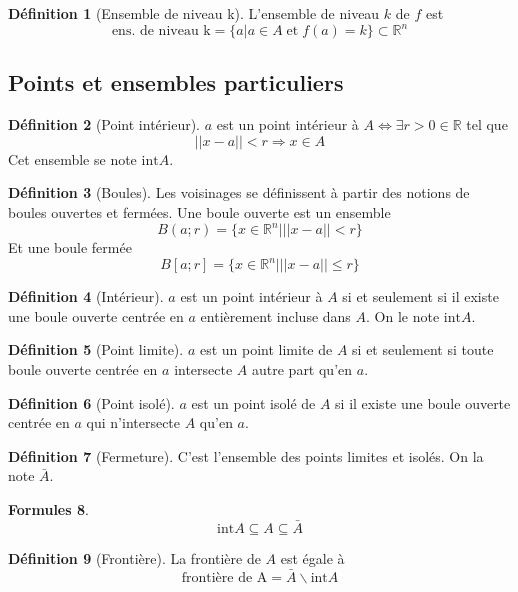 \documentclass[11pt,a4paper]{article}
\theoremstyle{definition}
\newtheorem{mydef}{Définition}[section]
\newtheorem{myform}[mydef]{Formules}
\newcommand{\R}{\mathbb{R}}
\begin{document}
\begin{mydef} [Ensemble de niveau k] L'ensemble de niveau $k$ de $f$ est
\[ \text{ens. de niveau k} = \{ a | a \in A \;\text{et}\; f(a) = k \} \subset \R^n \]
\end{mydef}

\subsection{Points et ensembles particuliers}

\begin{mydef}[Point intérieur] $a$ est un point intérieur à $A \Leftrightarrow \exists r > 0 \in \R$ tel que
\[ ||x - a|| < r \Rightarrow x \in A \]
Cet ensemble se note $\mathrm{int} A$.
\end{mydef}

\begin{mydef} [Boules] Les voisinages se définissent à partir des notions de boules ouvertes et fermées. Une boule ouverte est un ensemble
\[ B(a;r) = \{ x \in \R^n | ||x-a|| < r \} \]
Et une boule fermée
\[ B[a;r] = \{ x \in \R^n | ||x-a|| \leq r \} \]
\end{mydef}

\begin{mydef} [Intérieur] $a$ est un point intérieur à $A$ si et seulement si il existe une boule ouverte centrée en $a$ entièrement incluse dans $A$. On le note $\mathrm{int} A$. \end{mydef}

\begin{mydef} [Point limite] $a$ est un point limite de $A$ si et seulement si toute boule ouverte centrée en $a$ intersecte $A$ autre part qu'en $a$. \end{mydef}

\begin{mydef} [Point isolé] $a$ est un point isolé de $A$ si il existe une boule ouverte centrée en $a$ qui n'intersecte $A$ qu'en $a$. \end{mydef}

\begin{mydef} [Fermeture] C'est l'ensemble des points limites et isolés. On la note $\bar{A}$. \end{mydef}

\begin{myform}
\[ \mathrm{int} A \subseteq A \subseteq \bar{A} \]
\end{myform}

\begin{mydef} [Frontière] La frontière de $A$ est égale à
\[ \text{frontière de A} = \bar{A} \backslash \mathrm{int} A \]
\end{mydef}
\end{document}
